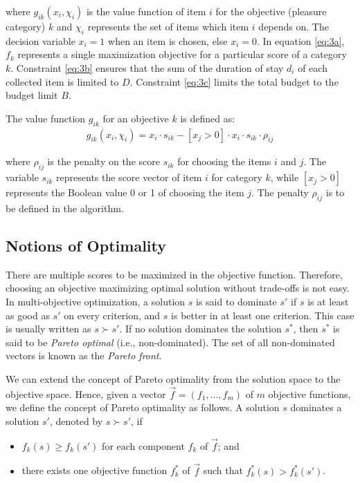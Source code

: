 where $g_{ik}(x_i, \chi_{i})$ is the value function of item $i$ for the objective (pleasure category) $k$ and $\chi_i$ represents the set of items which item $i$ depends on. The decision variable $x_i = 1$ when an item is chosen, else $x_i = 0$. In equation \ref{eq:3a}, $f_k$ represents a single maximization objective for a particular score of a category $k$. Constraint \ref{eq:3b} ensures that the sum of the duration of stay $d_i$ of each collected item is limited to $D$. Constraint \ref{eq:3c} limits the total budget to the budget limit $B$.

The value function $g_{ik}$ for an objective $k$ is defined as:
\begin{gather*}
    g_{ik}(x_i, \chi_i) = x_i \cdot s_{ik} -  [x_j > 0] \cdot x_i \cdot s_{ik} \cdot \rho_{ij}
\end{gather*}

where $\rho_{ij}$ is the penalty on the score $s_{ik}$ for choosing the items $i$ and $j$. The variable $s_{ik}$ represents the score vector of item $i$ for category $k$, while $[x_j > 0]$ represents the Boolean value 0 or 1 of choosing the item $j$. The penalty $\rho_{ij}$ is to be defined in the algorithm. 

\subsection{Notions of Optimality}
There are multiple scores to be maximized in the objective function. Therefore, choosing an objective maximizing optimal solution without trade-offs is not easy. In multi-objective optimization, a solution $s$ is said to dominate $s'$ if $s$ is at least as good as $s'$ on every criterion, and $s$ is better in at least one criterion. This case is usually written as $s \succ s'$. If no solution dominates the solution $s^*$, then $s^*$ is said to be \textit{Pareto optimal} (i.e., non-dominated). The set of all non-dominated vectors is known as the \textit{Pareto front}.

We can extend the concept of Pareto optimality from the solution space to the objective space. Hence, given a vector $\Vec{f} = (f_1,...,f_m)$ of $m$ objective functions, we define the concept of Pareto optimality as follows. A solution $s$ dominates a solution $s'$, denoted by $s \succ s'$, if
\begin{itemize}
    \item $f_k(s) \geq f_k(s')$ for each component $f_k$ of $\Vec{f}$; and
    \item there exists one objective function $f_k^*$ of $\Vec{f}$ such that $f_k^*(s) > f_k^*(s')$.
\end{itemize}

